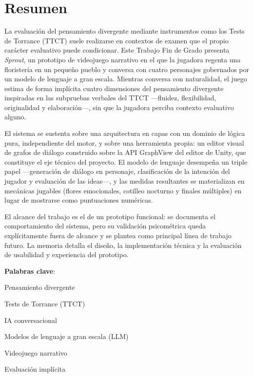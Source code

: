 \documentclass[12pt,twoside,titlepage]{report}
\begin{document}







\chapter*{Resumen}

La evaluación del pensamiento divergente mediante instrumentos como los Tests de Torrance (TTCT) suele realizarse en contextos de examen que el propio carácter evaluativo puede condicionar. Este Trabajo Fin de Grado presenta \textit{Sprout}, un prototipo de videojuego narrativo en el que la jugadora regenta una floristería en un pequeño pueblo y conversa con cuatro personajes gobernados por un modelo de lenguaje a gran escala. Mientras conversa con naturalidad, el juego estima de forma implícita cuatro dimensiones del pensamiento divergente inspiradas en las subpruebas verbales del TTCT ---fluidez, flexibilidad, originalidad y elaboración---, sin que la jugadora perciba contexto evaluativo alguno.

El sistema se sustenta sobre una arquitectura en capas con un dominio de lógica pura, independiente del motor, y sobre una herramienta propia: un editor visual de grafos de diálogo construido sobre la API GraphView del editor de Unity, que constituye el eje técnico del proyecto. El modelo de lenguaje desempeña un triple papel ---generación de diálogo en personaje, clasificación de la intención del jugador y evaluación de las ideas---, y las medidas resultantes se materializan en mecánicas jugables (flores emocionales, cotilleo nocturno y finales múltiples) en lugar de mostrarse como puntuaciones numéricas.

El alcance del trabajo es el de un prototipo funcional: se documenta el comportamiento del sistema, pero su validación psicométrica queda explícitamente fuera de alcance y se plantea como principal línea de trabajo futuro. La memoria detalla el diseño, la implementación técnica y la evaluación de usabilidad y experiencia del prototipo.

\mbox{} \bigskip

\noindent \textbf{Palabras clave}:
\begin{compactitem}
    \item Pensamiento divergente
    \item Tests de Torrance (TTCT)
    \item IA conversacional
    \item Modelos de lenguaje a gran escala (LLM)
    \item Videojuego narrativo
    \item Evaluación implícita
\end{compactitem}
\end{document}
